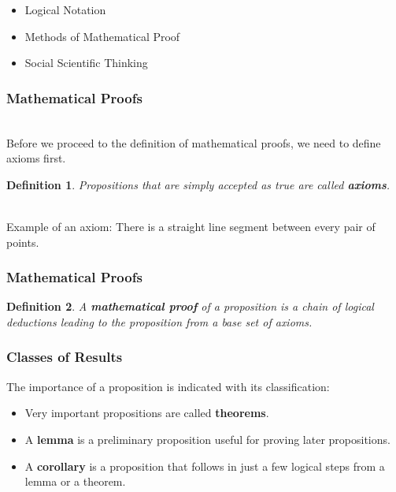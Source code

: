 \documentclass[aspectratio=169]{beamer}
\newtheorem{defn}{Definition}
\numberwithin{equation}{section}
\begin{document}
\begin{frame}

\begin{itemize}
\item \textcolor{mygray}{Logical Notation}
\item \textcolor{myblack}{Methods of Mathematical Proof}
\item \textcolor{mygray}{Social Scientific Thinking}
\end{itemize}

\end{frame}



\begin{frame}
\frametitle{Mathematical Proofs}

\ \\Before we proceed to the definition of mathematical proofs, we need to define axioms first. \pause

\begin{defn}
Propositions that are simply accepted as true are called \textbf{axioms}.
\end{defn} \pause

\ \\Example of an axiom: There is a straight line segment between every pair of points.

\end{frame}



\begin{frame}
\frametitle{Mathematical Proofs}

\begin{defn}
A \textbf{mathematical proof} of a proposition is a chain of logical deductions leading to the proposition from a base set of axioms.
\end{defn}

\end{frame}



\begin{frame}
\frametitle{Classes of Results}

The importance of a proposition is indicated with its classification: \pause

\begin{itemize}
\item Very important propositions are called \textbf{theorems}. \pause
\item A \textbf{lemma} is a preliminary proposition useful for proving later propositions. \pause
\item A \textbf{corollary} is a proposition that follows in just a few logical steps from a lemma or a theorem.
\end{itemize}

\end{frame}
\end{document}

